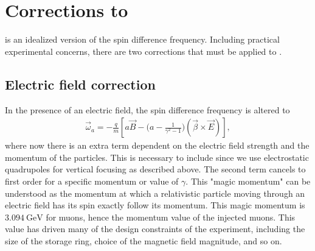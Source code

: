 \section{Corrections to \texorpdfstring{\wa}{wa}}

 is an idealized version of the spin difference frequency. Including practical experimental concerns, there are two corrections that must be applied to \wa.

\subsection{Electric field correction}
\label{sub:electric_field_correction}

In the presence of an electric field, the spin difference frequency is altered to 
        \begin{align} \label{eq:waelectric}
            \vec{\omega}_{a} = -\frac{q}{m} [a\vec{B} - \Big(a - \frac{1}{\gamma^{2}-1}\Big)(\vec{\beta} \times \vec{E}) ],
        \end{align}
where now there is an extra term dependent on the electric field strength and the momentum of the particles. This is necessary to include since we use electrostatic quadrupoles for vertical focusing as described above. The second term cancels to first order for a specific momentum or value of $\gamma$. This "magic momentum" can be understood as the momentum at which a relativistic particle moving through an electric field has its spin exactly follow its momentum. This magic momentum is $\SI{3.094}{\GeV}$ for muons, hence the momentum value of the injected muons. This value has driven many of the design constraints of the \gmtwo experiment, including the size of the storage ring, choice of the magnetic field magnitude, and so on.

